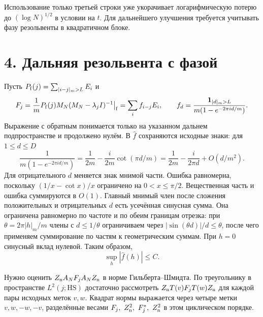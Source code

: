 \documentclass[11pt,a4paper]{article}
\newcommand{\sect}[1]{\section*{\sffamily\color{ink}#1}}
\begin{document}
Использование только третьей строки уже укорачивает логарифмическую потерю до \((\log N)^{1/2}\) в условии на \(t\). Для дальнейшего улучшения требуется учитывать фазу резольвенты в квадратичном блоке.
\newpage
\sect{4. Дальняя резольвента с фазой}
Пусть \(P_{\rm f}(j)=\sum_{|i-j|_m>L}E_i\) и
\[
     F_j=\frac1m P_{\rm f}(j)M_N(M_N-\lambda_jI)^{-1}\big|_{\rm f}
       =\sum_i f_{i-j}E_i,\qquad
     f_d=\frac{\mathbf1_{|d|_m>L}}{m(1-e^{-2\pi i d/m})}.
\]
Выражение с обратным понимается только на указанном дальнем подпространстве и продолжено нулём. В \(\widehat f\) сохраняются исходные знаки: для \(1\le d\le D\)
\[
       \frac1{m(1-e^{-2\pi i d/m})}
         =\frac1{2m}-\frac{i}{2m}\cot(\pi d/m)
         =\frac1{2m}-\frac{i}{2\pi d}+O(d/m^2).
\]
Для отрицательного \(d\) меняется знак мнимой части. Ошибка равномерна, поскольку \((1/x-\cot x)/x\) ограничено на \(0<x\le\pi/2\). Вещественная часть и ошибка суммируются в \(O(1)\). Главный мнимый член после сложения положительных и отрицательных \(d\) есть усечённая синусная сумма. Она ограничена равномерно по частоте и по обеим границам отрезка: при \(\theta=2\pi |h|_m/m\) члены с \(d\le1/\theta\) ограничиваем через \(|\sin(\theta d)|/d\le\theta\), после чего применяем суммирование по частям к геометрическим суммам. При \(h=0\) синусный вклад нулевой. Таким образом,
\begin{equation}
                              \sup_h|\widehat f(h)|\le C .      \tag{8}
\end{equation}

Нужно оценить \(Z_{\rm n} A_N F_j A_N Z_{\rm n}\) в норме Гильберта--Шмидта. По треугольнику в пространстве \(L^2(j;\mathrm{HS})\) достаточно рассмотреть
\(Z_{\rm n} T(v) F_j T(w) Z_{\rm n}\) для каждой пары исходных меток \(v,w\). Квадрат нормы выражается через четыре метки \(v,w,-w,-v\), разделённые весами \(F_j,\ Z_{\rm n}^2,\ F_j^*,\ Z_{\rm n}^2\) в этом циклическом порядке.
\end{document}
